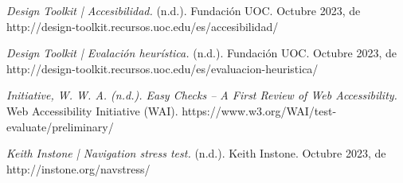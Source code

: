 \documentclass[spanish]{article}
\begin{document}
\begin{thebibliography}{X}

\item \textit{Design Toolkit | Accesibilidad.} (n.d.). Fundación UOC. Octubre
2023, de http://design-toolkit.recursos.uoc.edu/es/accesibilidad/

\item \textit{Design Toolkit | Evalación heurística.} (n.d.). Fundación UOC.
Octubre 2023, de http://design-toolkit.recursos.uoc.edu/es/evaluacion-heuristica/

\item \textit{Initiative, W. W. A. (n.d.). Easy Checks – A First Review of Web
        Accessibility.} Web Accessibility Initiative (WAI).
https://www.w3.org/WAI/test-evaluate/preliminary/

\item \textit{Keith Instone | Navigation stress test.} (n.d.). Keith Instone.
        Octubre 2023, de http://instone.org/navstress/

\end{thebibliography}
\end{document}

